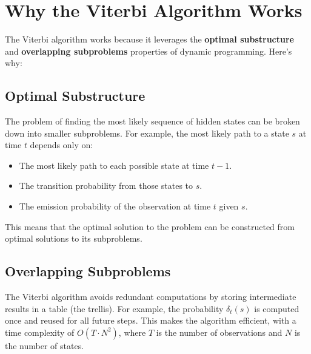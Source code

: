 \begin{notechapter}
\begin{center}
\end{center}

\section{Why the Viterbi Algorithm Works}
The Viterbi algorithm works because it leverages the 
\textbf{optimal substructure} and \textbf{overlapping subproblems} 
properties of dynamic programming. Here's why:

\subsection{Optimal Substructure}
The problem of finding the most likely sequence of hidden 
states can be broken down into smaller subproblems. For 
example, the most likely path to a state \( s \) at time \( t \) 
depends only on:
\begin{itemize}
    \item The most likely path to each possible state at 
          time \( t-1 \).
    \item The transition probability from those states to 
          \( s \).
    \item The emission probability of the observation at 
          time \( t \) given \( s \).
\end{itemize}

This means that the optimal solution to the problem can be 
constructed from optimal solutions to its subproblems.

\subsection{Overlapping Subproblems}
The Viterbi algorithm avoids redundant computations by 
storing intermediate results in a table (the trellis). For 
example, the probability \( \delta_t(s) \) is computed once 
and reused for all future steps. This makes the algorithm 
efficient, with a time complexity of \( O(T \cdot N^2) \), 
where \( T \) is the number of observations and \( N \) is the 
number of states.


\end{notechapter}
